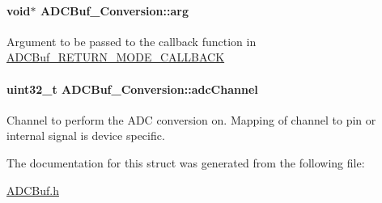 \paragraph[{arg}]{\setlength{\rightskip}{0pt plus 5cm}void$\ast$ A\+D\+C\+Buf\+\_\+\+Conversion\+::arg}\label{struct_a_d_c_buf___conversion_a47080bd2e4d552858be60f6e25be58dc}
Argument to be passed to the callback function in \hyperlink{_a_d_c_buf_8h_a3d643e8024503c5ef2679c83419ba6eea633b4b063b88d7c62e9e2513075a36a7}{A\+D\+C\+Buf\+\_\+\+R\+E\+T\+U\+R\+N\+\_\+\+M\+O\+D\+E\+\_\+\+C\+A\+L\+L\+B\+A\+C\+K} 
\paragraph[{adc\+Channel}]{\setlength{\rightskip}{0pt plus 5cm}uint32\+\_\+t A\+D\+C\+Buf\+\_\+\+Conversion\+::adc\+Channel}\label{struct_a_d_c_buf___conversion_a379de126469bdd35de64c36498fafb51}
Channel to perform the A\+D\+C conversion on. Mapping of channel to pin or internal signal is device specific. 

The documentation for this struct was generated from the following file\+:\begin{DoxyCompactItemize}
\item 
\hyperlink{_a_d_c_buf_8h}{A\+D\+C\+Buf.\+h}\end{DoxyCompactItemize}
